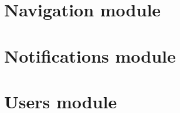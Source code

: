 \documentclass{article}
\begin{document}
			

	\clearpage
	
	\section{Navigation module}\label{sec:navigation}
	
	
	
	\clearpage
	
	\section{Notifications module}\label{sec:notification}
	
	
	
	\clearpage
	
	\section{Users module}\label{sec:users}
	
	
\end{document}
